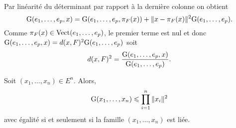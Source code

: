 \begin{preuve}
\begin{align*}
    \end{align*}
    Par linéarité du déterminant par rapport à la dernière colonne on obtient
    $$\mathrm{G}(e_1, \dots, e_p, x) = \mathrm{G}(e_1, \dots, e_p, \pi_F(x)) + \Vert x - \pi_F(x) \Vert^2 \mathrm{G}(e_1, \dots, e_p).$$
    Comme $\pi_F(x) \in \mathrm{Vect}(e_1, \dots, e_p)$, le premier terme est nul et donc $\mathrm{G}(e_1, \dots, e_p, x) = d(x, F)^2 \mathrm{G}(e_1, \dots, e_p)$ soit 
    $$d(x, F)^2 = \frac{\mathrm{G}(e_1, \dots, e_p, x)}{\mathrm{G}(e_1, \dots, e_p)}.$$
\end{preuve}

\begin{corol} \label{inegalite_gram}
    Soit $(x_1, \dots, x_n) \in E^n$. Alors,
    $$\mathrm{G}(x_1, \dots, x_n) \leqslant \prod_{i=1}^n \Vert x_i \Vert^2$$
    avec égalité si et seulement si la famille $(x_1, \dots, x_n)$ est liée. 
\end{corol}

